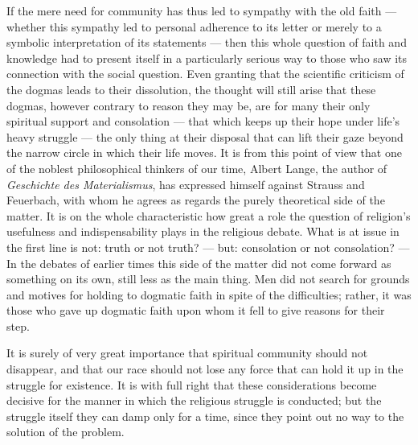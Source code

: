 \documentclass[12pt,a4paper]{article}
\begin{document}
If the mere need for community has thus led to sympathy with the old faith ---
whether this sympathy led to personal adherence to its letter or merely to a
symbolic interpretation of its statements --- then this whole question of
faith and knowledge had to present itself in a particularly serious way to
those who saw its connection with the social question. Even granting that the
scientific criticism of the dogmas leads to their dissolution, the thought will
still arise that these dogmas, however contrary to reason they may be, are for
many their only spiritual support and consolation --- that which keeps up
their hope under life's heavy struggle --- the only thing at their disposal
that can lift their gaze beyond the narrow circle in which their life moves.
It is from this point of view that one of the noblest philosophical thinkers of
our time, Albert Lange, the author of \emph{Geschichte des Materialismus}, has
expressed himself against Strauss and Feuerbach, with whom he agrees as
regards the purely theoretical side of the matter. It is on the whole
characteristic how great a role the question of religion's usefulness and
indispensability plays in the religious debate. What is at issue in the first
line is not: truth or not truth? --- but: consolation or not consolation? ---
In the debates of earlier times this side of the matter did not come forward
as something on its own, still less as the main thing. Men did not search for
grounds and motives for holding to dogmatic faith in spite of the
difficulties; rather, it was those who gave up dogmatic faith upon whom it fell
to give reasons for their step.

It is surely of very great importance that spiritual community should not
disappear, and that our race should not lose any force that can hold it up in
the struggle for existence. It is with full right that these considerations
become decisive for the manner in which the religious struggle is conducted;
but the struggle itself they can damp only for a time, since they point out no
way to the solution of the problem.
\end{document}
